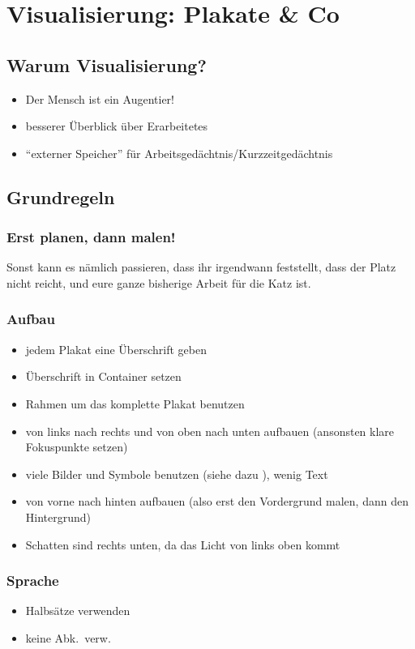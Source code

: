 \section{Visualisierung: Plakate \& Co}

\subsection{Warum Visualisierung?}
\begin{itemize}
  \item Der Mensch ist ein Augentier!
  \item besserer Überblick über Erarbeitetes
  \item "`externer Speicher"' für Arbeitsgedächtnis/Kurzzeitgedächtnis
\end{itemize}

\subsection{Grundregeln}

\subsubsection{Erst planen, dann malen!}
Sonst kann es nämlich passieren, dass ihr irgendwann feststellt, dass der Platz nicht reicht, und eure ganze bisherige Arbeit für die Katz ist.

\subsubsection{Aufbau}
\begin{itemize}
  \item jedem Plakat eine Überschrift geben
  \item Überschrift in Container setzen
  \item Rahmen um das komplette Plakat benutzen
  \item von links nach rechts und von oben nach unten aufbauen (ansonsten klare Fokuspunkte setzen)
  \item viele Bilder und Symbole benutzen (siehe dazu \cite{bikablo}), wenig Text
  \item von vorne nach hinten aufbauen (also erst den Vordergrund malen, dann den Hintergrund)
  \item Schatten sind rechts unten, da das Licht von links oben kommt
\end{itemize}

\subsubsection{Sprache}
\begin{itemize}
  \item Halbsätze verwenden
  \item keine Abk.~verw.
\end{itemize}

